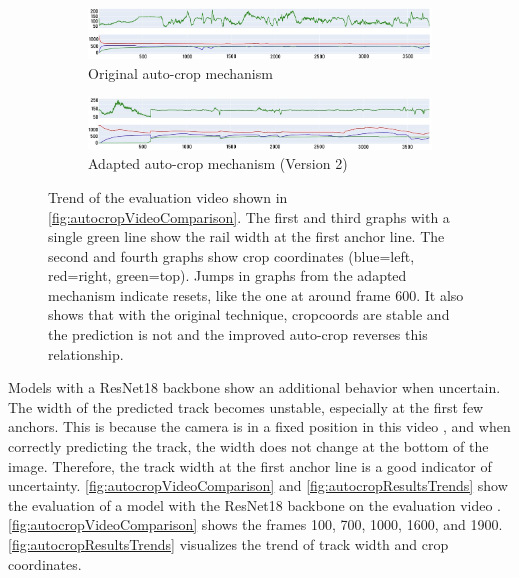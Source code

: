 \begin{figure}[H]
    \centering
    \begin{subfigure}{\textwidth}
        \centering
        \includegraphics[width=\textwidth]{PICs/experiments/autocropExperiments/original_updated.jpg} %
        \caption{Original auto-crop mechanism}
        \label{fig:autocropResultsTrends_a}
    \end{subfigure}
    \begin{subfigure}{\textwidth}
        \centering
        \includegraphics[width=\textwidth]{PICs/experiments/autocropExperiments/improved_updated.jpg} %
        \caption{Adapted auto-crop mechanism (Version 2)}
        \label{fig:autocropResultsTrends_b}
    \end{subfigure}
    \caption{Trend of the evaluation video \cite{temporalDataset_youtube_video} shown in \autoref{fig:autocropVideoComparison}.
    The first and third graphs with a single green line show the rail width at the first anchor line.
    The second and fourth graphs show crop coordinates (blue=left, red=right, green=top).
    Jumps in graphs from the adapted mechanism indicate resets, like the one at around frame 600.
    It also shows that with the original technique, cropcoords are stable and the prediction is not and the improved auto-crop reverses this relationship.}
    \label{fig:autocropResultsTrends}
\end{figure}


\noindent Models with a ResNet18 backbone show an additional behavior when uncertain.
The width of the predicted track becomes unstable, especially at the first few anchors.
This is because the camera is in a fixed position in this video \cite{temporalDataset_youtube_video}, and when correctly predicting the track, the width does not change at the bottom of the image.
Therefore, the track width at the first anchor line is a good indicator of uncertainty.
\autoref{fig:autocropVideoComparison} and \autoref{fig:autocropResultsTrends} show the evaluation of a model with the ResNet18 backbone on the evaluation video \cite{temporalDataset_youtube_video}.
\autoref{fig:autocropVideoComparison} shows the frames 100, 700, 1000, 1600, and 1900.
\autoref{fig:autocropResultsTrends} visualizes the trend of track width and crop coordinates.


